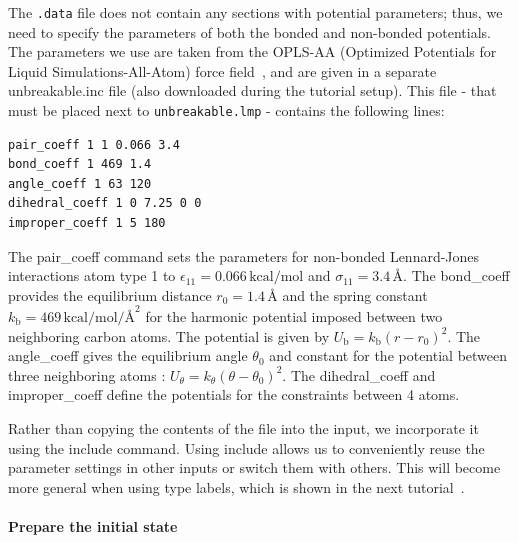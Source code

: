 \documentclass[9pt,tutorial]{livecoms}
\newcommand{\lmpcmd}[1]{\hspace{0pt}\colorbox{listing}{\textcolor{command}{\small{#1}}}\hspace{0pt}} %
\newcommand{\flecmd}[1]{\textcolor{command}{\texttt{#1}}} %
\begin{document}
The \flecmd{.data} file does not contain any sections with potential parameters; thus,
we need to specify the parameters of both the bonded and
non-bonded potentials.  The parameters we use are taken
from the OPLS-AA (Optimized Potentials for Liquid Simulations-All-Atom)
force field~\cite{jorgensenDevelopmentTestingOPLS1996}, and are given
in a separate \lmpcmd{unbreakable.inc} file (also downloaded during
the tutorial setup).  This file - that must be placed
next to \flecmd{unbreakable.lmp} - contains the following lines:
\begin{lstlisting}
pair_coeff 1 1 0.066 3.4
bond_coeff 1 469 1.4
angle_coeff 1 63 120
dihedral_coeff 1 0 7.25 0 0
improper_coeff 1 5 180
\end{lstlisting}
The \lmpcmd{pair\_coeff} command sets the parameters for non-bonded
Lennard-Jones interactions atom type 1 to
$\epsilon_{11} = 0.066 \, \text{kcal/mol}$ and
$\sigma_{11} = 3.4 \, \text{\AA{}}$.  The \lmpcmd{bond\_coeff} provides
the equilibrium distance $r_0= 1.4 \, \text{\AA{}}$ and the
spring constant $k_\text{b} = 469 \, \text{kcal/mol/\AA{}}^2$ for the
harmonic potential imposed between two neighboring carbon atoms.  The potential
is given by $U_\text{b} = k_\text{b} ( r - r_0)^2$.  The
\lmpcmd{angle\_coeff} gives the equilibrium angle $\theta_0$ and
constant for the potential between three neighboring atoms :
$U_\theta = k_\theta ( \theta - \theta_0)^2$.  The
\lmpcmd{dihedral\_coeff} and \lmpcmd{improper\_coeff} define the potentials
for the constraints between 4 atoms.

\begin{note}
Rather than copying the contents of the file into the input, we
incorporate it using the \lmpcmd{include} command.  Using \lmpcmd{include} allows
us to conveniently reuse the parameter settings
in other inputs or switch them with others.  This will become more general
when using type labels, which is shown in the next
tutorial~\cite{typelabel_paper}.
\end{note}

\paragraph{Prepare the initial state}
\end{document}
